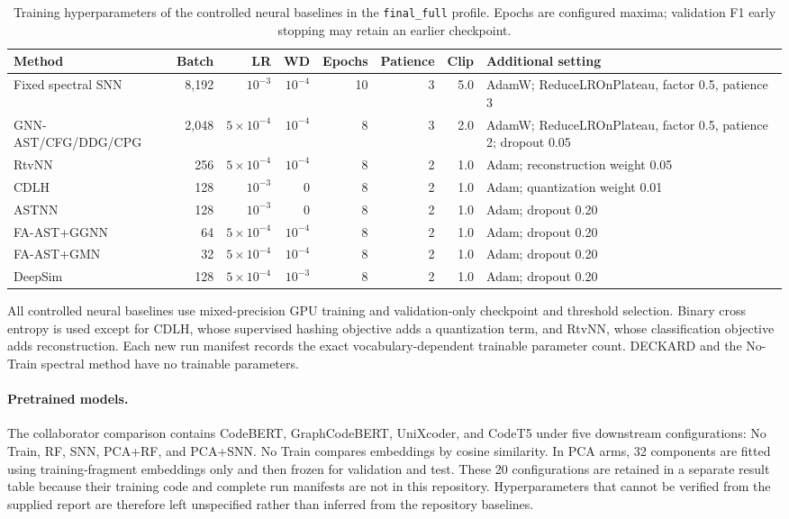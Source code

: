 \documentclass[authoryear,final,5p,times,twocolumn]{elsarticle}
\newcommand{\added}[1]{{\color{green!50!black}#1}}
\theoremstyle{plain}
\begin{document}
\begin{table}[t]
\centering
\caption{Training hyperparameters of the controlled neural baselines in the
\texttt{final\_full} profile. Epochs are configured maxima; validation F1 early
stopping may retain an earlier checkpoint.}
\label{tab:baseline_optimization}
\scriptsize
\renewcommand{\arraystretch}{1.10}
\setlength{\tabcolsep}{3pt}
\begin{tabularx}{\textwidth}{@{}p{}rrrrrrX@{}}
\toprule
Method & Batch & LR & WD & Epochs & Patience & Clip & Additional setting \\
\midrule
Fixed spectral SNN & 8,192 & $10^{-3}$ & $10^{-4}$ & 10 & 3 & 5.0 &
AdamW; ReduceLROnPlateau, factor 0.5, patience 3 \\
GNN-AST/CFG/DDG/CPG & 2,048 & $5\!\times\!10^{-4}$ & $10^{-4}$ & 8 & 3 & 2.0 &
AdamW; ReduceLROnPlateau, factor 0.5, patience 2; dropout 0.05 \\
RtvNN & 256 & $5\!\times\!10^{-4}$ & $10^{-4}$ & 8 & 2 & 1.0 & Adam; reconstruction weight 0.05 \\
CDLH & 128 & $10^{-3}$ & 0 & 8 & 2 & 1.0 & Adam; quantization weight 0.01 \\
ASTNN & 128 & $10^{-3}$ & 0 & 8 & 2 & 1.0 & Adam; dropout 0.20 \\
FA-AST+GGNN & 64 & $5\!\times\!10^{-4}$ & $10^{-4}$ & 8 & 2 & 1.0 & Adam; dropout 0.20 \\
FA-AST+GMN & 32 & $5\!\times\!10^{-4}$ & $10^{-4}$ & 8 & 2 & 1.0 & Adam; dropout 0.20 \\
DeepSim & 128 & $5\!\times\!10^{-4}$ & $10^{-3}$ & 8 & 2 & 1.0 & Adam; dropout 0.20 \\
\bottomrule
\end{tabularx}
\end{table}
\endgroup

\added{All controlled neural baselines use mixed-precision GPU training and
validation-only checkpoint and threshold selection. Binary cross entropy is
used except for CDLH, whose supervised hashing objective adds a quantization
term, and RtvNN, whose classification objective adds reconstruction. Each new
run manifest records the exact vocabulary-dependent trainable parameter count.
DECKARD and the No-Train spectral method have no trainable parameters.}

\paragraph{Pretrained models.}
\added{The collaborator comparison contains CodeBERT, GraphCodeBERT, UniXcoder,
and CodeT5 under five downstream configurations: No Train, RF, SNN, PCA+RF,
and PCA+SNN. No Train compares embeddings by cosine similarity. In PCA arms,
32 components are fitted using training-fragment embeddings only and then frozen
for validation and test. These 20 configurations are retained in a separate
result table because their training code and complete run manifests are not in
this repository. Hyperparameters that cannot be verified from the supplied
report are therefore left unspecified rather than inferred from the repository
baselines.}
\end{document}
